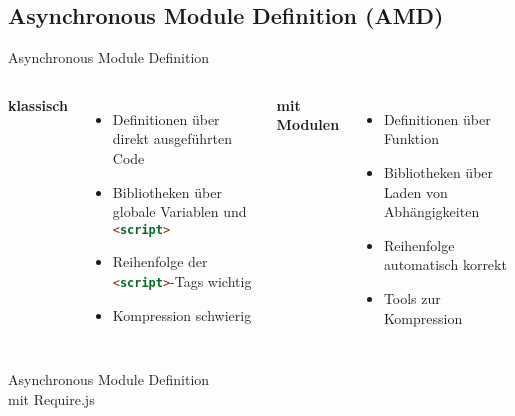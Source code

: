 \subsection[AMD]{Asynchronous Module Definition (AMD)}


\begin{frame}{Asynchronous Module Definition}
  \begin{columns}
    {\large\bfseries\color{maincolor}klassisch}
    \begin{itemize}
      \item Definitionen über direkt ausgeführten Code
      \item Bibliotheken über globale Variablen und \lstinline[language=HTML]-<script>-
      \item Reihenfolge der \lstinline[language=HTML]-<script>--Tags wichtig
      \item Kompression schwierig
    \end{itemize}
    {\large\bfseries\color{maincolor}mit Modulen}
    \begin{itemize}
      \item Definitionen über Funktion
      \item Bibliotheken über Laden von Abhängigkeiten
      \item Reihenfolge automatisch korrekt
      \item Tools zur Kompression
    \end{itemize}
  \end{columns}
\end{frame}

\begin{frame}{Asynchronous Module Definition\\ mit Require.js}
  \begin{center}
    
  \end{center}
\end{frame}

\lstset{basicstyle=\ttfamily\scriptsize}

